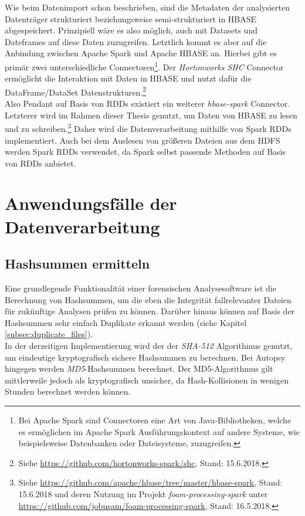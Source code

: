 \noindent
Wie beim Datenimport schon beschrieben, sind die Metadaten der analysierten Datenträger strukturiert beziehungsweise semi-strukturiert in HBASE abgespeichert. Prinzipiell wäre es also möglich, auch mit Datasets und Dateframes auf diese Daten zuzugreifen. Letztlich kommt es aber auf die Anbindung zwischen Apache Spark und Apache HBASE an. Hierbei gibt es primär zwei unterschiedliche Connectoren\footnote{Bei Apache Spark sind Connectoren eine Art von Java-Bibliotheken, welche es ermöglichen im Apache Spark Ausführungskontext auf andere Systeme, wie beispielsweise Datenbanken oder Dateisysteme, zuzugreifen.}. Der \textit{Hortonworks SHC} Connector ermöglicht die Interaktion mit Daten in HBASE und nutzt dafür die DataFrame/DataSet Datenstrukturen.\footnote{Siehe \url{https://github.com/hortonworks-spark/shc}, Stand: 15.6.2018.}\\ 
Also Pendant auf Basis von RDDs existiert ein weiterer \textit{hbase-spark} Connector. Letzterer wird im Rahmen dieser Thesis genutzt, um Daten von HBASE zu lesen und zu schreiben.\footnote{Siehe \url{https://github.com/apache/hbase/tree/master/hbase-spark}, Stand: 15.6.2018 und deren Nutzung im Projekt \textit{foam-processing-spark} unter \url{https://github.com/jobusam/foam-processing-spark}, Stand: 16.5.2018.}
Daher wird die Datenverarbeitung mithilfe von Spark RDDs implementiert. Auch bei dem Auslesen von größeren Dateien aus dem HDFS werden Spark RDDs verwendet, da Spark selbst passende Methoden auf Basis von RDDs anbietet.


\section{Anwendungsfälle der Datenverarbeitung}
\subsection{Hashsummen ermitteln}
Eine grundlegende Funktionalität einer forensischen Analysesoftware ist die Berechnung von Hashsummen, um die eben die Integrität fallrelevanter Dateien für zukünftige Analysen prüfen zu können. Darüber hinaus können auf Basis der Hashsummen sehr einfach Duplikate erkannt werden (siehe Kapitel \ref{subsec:duplicate_files}).\\
In der derzeitigen Implementierung wird der der \textit{SHA-512} Algorithmus genutzt, um eindeutige kryptografisch sichere Hashsummen zu berechnen. Bei Autopsy hingegen werden \textit{MD5}-Hashsummen berechnet. Der MD5-Algorithmus gilt mittlerweile jedoch als kryptografisch unsicher, da Hash-Kollisionen in wenigen Stunden berechnet werden können.\cite[S. 240-243]{hacking_and_security}\\


